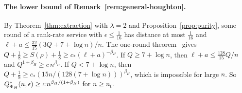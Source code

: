 \paragraph{The lower bound of Remark~\ref{rem:general-houghton}.} By Theorem~\ref{thm:extraction} with $\lambda=2$ and Proposition~\ref{prop:purity}, some round of a rank-rate
service with $\epsilon\le\frac1{16}$ has distance at most $\frac1{16}$ and $\ell+a\le\frac{32}{15}(3Q+7+\log n)/n$. The one-round theorem~\cite[Theorem~5.5]{DouglasMghirbiB} gives
$Q+\frac18\ge S(\rho)+\frac18\ge c_*(\ell+a)^{-\beta_H}$. If $Q\ge7+\log n$, then $\ell+a\le\frac{128}{15}Q/n$ and $Q^{1+\beta_H}\ge c\,n^{\beta_H}$. If $Q<7+\log n$, then
$Q+\frac18\ge c_*(15n/(128(7+\log n)))^{\beta_H}$, which is impossible for large $n$. So $Q^{*}_{\Phi_H}(n,\epsilon)\ge c\,n^{\beta_H/(1+\beta_H)}$ for $n\ge n_0$.
